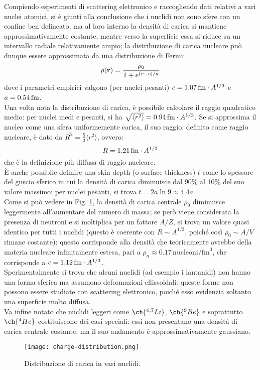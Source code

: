 Compiendo esperimenti di scattering elettronico e raccogliendo dati relativi a vari nuclei atomici, si è giunti alla conclusione che i nuclidi non sono sfere con un confine ben delineato, ma al loro interno la densità di carica si mantiene approssimativamente costante, mentre verso la superficie essa si riduce su un intervallo radiale relativamente ampio; la distribuzione di carica nucleare può dunque essere approssimata da una distribuzione di Fermi:
\begin{equation}
	\rho(\mathbf{r}) = \frac{\rho_0}{1 + e^{(r - c) / a}}
	\label{eq:14}
\end{equation}
dove i parametri empirici valgono (per nuclei pesanti) $ c = 1.07\,\text{fm} \cdot A^{1/3} $ e $ a = 0.54\,\text{fm} $.\\
Una volta nota la distribuzione di carica, è possibile calcolare il raggio quadratico medio: per nuclei medi e pesanti, si ha $ \sqrt{\langle r^2 \rangle} = 0.94\,\text{fm} \cdot A^{1/3} $. Se si approssima il nucleo come una sfera uniformemente carica, il suo raggio, definito come raggio nucleare, è dato da $ R^2 = \frac{5}{3} \langle r^2 \rangle $, ovvero:
\begin{equation}
	R = 1.21\,\text{fm} \cdot A^{1/3}
	\label{eq:14-bis}
\end{equation}
che è la definizione più diffusa di raggio nucleare.\\
È anche possibile definire una skin depth (o surface thickness) $ t $ come lo spessore del guscio sferico in cui la densità di carica diminuisce dal $ 90\% $ al $ 10\% $ del suo valore massimo: per nuclei pesanti, si trova $ t = 2a\ln9 \approx 4.4 a $.\\
Come si può vedere in Fig. \ref{charge-distr}, la densità di carica centrale $ \rho_0 $ diminuisce leggermente all'aumentare del numero di massa; se però viene considerata la presenza di neutroni e si moltiplica per un fattore $ A / Z $, si trova un valore quasi identico per tutti i nuclidi (questo è coerente con $ R \sim A^{1/3} $, poiché così $ \rho_0 \sim A / V $ rimane costante): questo corrisponde alla densità che teoricamente avrebbe della materia nucleare infinitamente estesa, pari a $ \rho_n \approx 0.17 \,\text{nucleoni} / \text{fm}^3 $, che corrisponde a $ c = 1.12\,\text{fm} \cdot A^{1/3} $.\\
Sperimentalmente si trova che alcuni nuclidi (ad esempio i lantanidi) non hanno una forma sferica ma assumono deformazioni ellissoidali: queste forme non possono essere studiate con scattering elettronico, poiché esso evidenzia soltanto una superficie molto diffusa.\\
Va infine notato che nuclidi leggeri come $ \ch{^{6,7}Li} $, $ \ch{^{9}Be} $ e soprattutto $ \ch{^{4}He} $ costituiscono dei casi speciali: essi non presentano una densità di carica centrale costante, ma il suo andamento è approssimativamente gaussiano.
\begin{figure}
	\centering
	\texttt{[image: charge-distribution.png]}
	\caption{Distribuzione di carica in vari nuclidi.}
	\label{charge-distr}
\end{figure}


